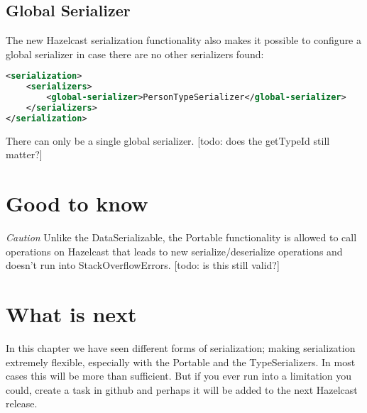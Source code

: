 \subsection{Global Serializer}
The new Hazelcast serialization functionality also makes it possible to configure a global serializer in case there are no other serializers found:
\begin{lstlisting}[language=xml]
<serialization>
    <serializers>
        <global-serializer>PersonTypeSerializer</global-serializer>
    </serializers>
</serialization>
\end{lstlisting}
There can only be a single global serializer. 
[todo: does the getTypeId still matter?]

\section{Good to know}

\emph{Caution} Unlike the DataSerializable, the Portable functionality is allowed to call operations on Hazelcast that leads to new serialize/deserialize operations and doesn't run into StackOverflowErrors. [todo: is this still valid?]

\section{What is next}
In this chapter we have seen different forms of serialization; making serialization extremely flexible, especially with the Portable and the TypeSerializers. In most cases this will be more than sufficient. But if you ever run into a limitation you could, create a task in github and perhaps it will be added to the next Hazelcast release.